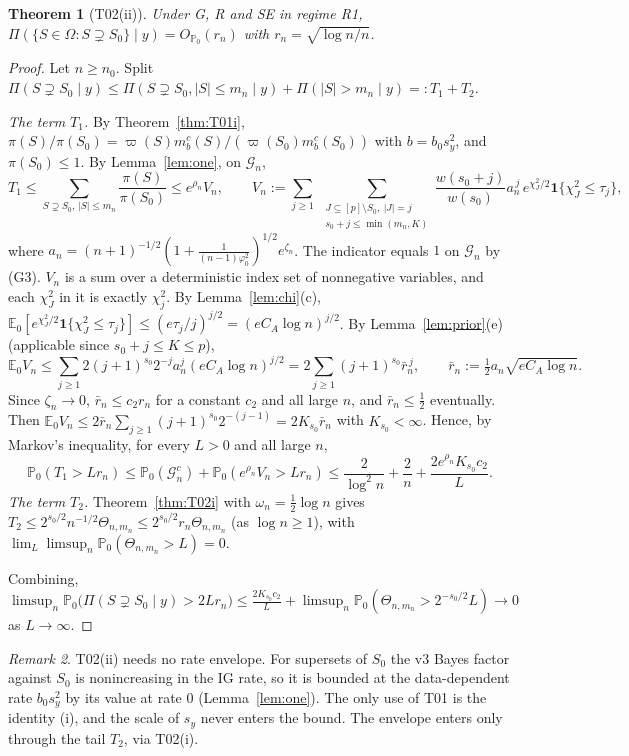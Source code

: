 \documentclass[11pt]{article}
\newtheorem{theorem}{Theorem}[section]
\theoremstyle{remark}
\newtheorem{remark}[theorem]{Remark}
\newcommand{\E}{\mathbb E}
\newcommand{\Prob}{\mathbb P}
\newcommand{\vp}{\varpi}
\newcommand{\Om}{\Omega}
\newcommand{\G}{\mathcal G}
\newcommand{\sy}{s_y}
\begin{document}
\begin{theorem}[T02(ii)]\label{thm:T02ii}
Under G, R and SE in regime R1, $\Pi(\{S\in\Om:S\supsetneq S_0\}\mid y)=O_{\Prob_0}(r_n)$ with $r_n=\sqrt{\log n/n}$.
\end{theorem}
\begin{proof}
Let $n\ge n_0$. Split $\Pi(S\supsetneq S_0\mid y)\le\Pi(S\supsetneq S_0,|S|\le m_n\mid y)+\Pi(|S|>m_n\mid y)=:T_1+T_2$.

\emph{The term $T_1$.} By Theorem~\ref{thm:T01i}, $\pi(S)/\pi(S_0)=\vp(S)m^c_b(S)/(\vp(S_0)m^c_b(S_0))$ with $b=b_0\sy^2$, and $\pi(S_0)\le1$. By Lemma~\ref{lem:one}, on $\G_n$,
\[
T_1\le\sum_{S\supsetneq S_0,\,|S|\le m_n}\frac{\pi(S)}{\pi(S_0)}\le e^{\rho_n}V_n,\qquad
V_n:=\sum_{j\ge1}\ \sum_{\substack{J\subseteq[p]\setminus S_0,\ |J|=j\\ s_0+j\le\min(m_n,K)}}\frac{w(s_0+j)}{w(s_0)}a_n^{\,j}\,e^{\chi^2_J/2}\mathbf 1\{\chi^2_J\le\tau_j\},
\]
where $a_n=(n+1)^{-1/2}(1+\frac1{(n-1)\varphi_0^2})^{1/2}e^{\zeta_n}$. The indicator equals $1$ on $\G_n$ by (G3). $V_n$ is a sum over a deterministic index set of nonnegative variables, and each $\chi^2_J$ in it is exactly $\chi^2_j$. By Lemma~\ref{lem:chi}(c), $\E_0[e^{\chi^2_J/2}\mathbf 1\{\chi^2_J\le\tau_j\}]\le(e\tau_j/j)^{j/2}=(eC_A\log n)^{j/2}$. By Lemma~\ref{lem:prior}(e) (applicable since $s_0+j\le K\le p$),
\[
\E_0V_n\le\sum_{j\ge1}2(j+1)^{s_0}2^{-j}a_n^j(eC_A\log n)^{j/2}=2\sum_{j\ge1}(j+1)^{s_0}\bar r_n^{\,j},\qquad\bar r_n:=\tfrac12a_n\sqrt{eC_A\log n}.
\]
Since $\zeta_n\to0$, $\bar r_n\le c_2r_n$ for a constant $c_2$ and all large $n$, and $\bar r_n\le\frac12$ eventually. Then $\E_0V_n\le2\bar r_n\sum_{j\ge1}(j+1)^{s_0}2^{-(j-1)}=2K_{s_0}\bar r_n$ with $K_{s_0}<\infty$. Hence, by Markov's inequality, for every $L>0$ and all large $n$,
\[
\Prob_0(T_1>Lr_n)\le\Prob_0(\G_n^c)+\Prob_0(e^{\rho_n}V_n>Lr_n)\le\frac2{\log^2n}+\frac2n+\frac{2e^{\rho_n}K_{s_0}c_2}{L}.
\]
\emph{The term $T_2$.} Theorem~\ref{thm:T02i} with $\omega_n=\frac12\log n$ gives $T_2\le2^{s_0/2}n^{-1/2}\Theta_{n,m_n}\le2^{s_0/2}r_n\Theta_{n,m_n}$ (as $\log n\ge1$), with $\lim_L\limsup_n\Prob_0(\Theta_{n,m_n}>L)=0$.

Combining, $\limsup_n\Prob_0\big(\Pi(S\supsetneq S_0\mid y)>2Lr_n\big)\le\frac{2K_{s_0}c_2}{L}+\limsup_n\Prob_0(\Theta_{n,m_n}>2^{-s_0/2}L)\to0$ as $L\to\infty$.
\end{proof}

\begin{remark}
T02(ii) needs no rate envelope. For supersets of $S_0$ the v3 Bayes factor against $S_0$ is nonincreasing in the IG rate, so it is bounded at the data-dependent rate $b_0\sy^2$ by its value at rate $0$ (Lemma~\ref{lem:one}). The only use of T01 is the identity (i), and the scale of $\sy$ never enters the bound. The envelope enters only through the tail $T_2$, via T02(i).
\end{remark}
\end{document}
